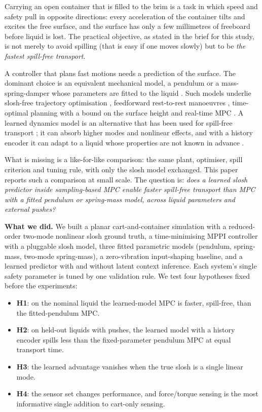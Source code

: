 Carrying an open container that is filled to the brim is a task in which speed and safety pull in opposite directions: every acceleration of the container tilts and excites the free surface, and the surface has only a few millimetres of freeboard before liquid is lost. The practical objective, as stated in the brief for this study, is not merely to avoid spilling (that is easy if one moves slowly) but to be \emph{the fastest spill-free transport}.

A controller that plans fast motions needs a prediction of the surface. The dominant choice is an equivalent mechanical model, a pendulum or a mass-spring-damper whose parameters are fitted to the liquid \cite{capolupo2025equivalent,guagliumi2021simple,leva2022sloshing}. Such models underlie slosh-free trajectory optimisation \cite{muchacho2022solution}, feedforward rest-to-rest manoeuvres \cite{toth2024rapid}, time-optimal planning with a bound on the surface height \cite{ferrari2026time} and real-time MPC \cite{medico2026model,hynninen2026emergency}. A learned dynamics model is an alternative that has been used for spill-free transport \cite{abderezaei2024clutter}; it can absorb higher modes and nonlinear effects, and with a history encoder it can adapt to a liquid whose properties are not known in advance \cite{kumar2021rma,evans2022context}.

What is missing is a like-for-like comparison: the same plant, optimiser, spill criterion and tuning rule, with only the slosh model exchanged. This paper reports such a comparison at small scale. The question is: \emph{does a learned slosh predictor inside sampling-based MPC enable faster spill-free transport than MPC with a fitted pendulum or spring-mass model, across liquid parameters and external pushes?}

\textbf{What we did.} We built a planar cart-and-container simulation with a reduced-order two-mode nonlinear slosh ground truth, a time-minimising MPPI controller with a pluggable slosh model, three fitted parametric models (pendulum, spring-mass, two-mode spring-mass), a zero-vibration input-shaping baseline, and a learned predictor with and without latent context inference. Each system's single safety parameter is tuned by one validation rule. We test four hypotheses fixed before the experiments:
\begin{itemize}
\item \textbf{H1}: on the nominal liquid the learned-model MPC is faster, spill-free, than the fitted-pendulum MPC.
\item \textbf{H2}: on held-out liquids with pushes, the learned model with a history encoder spills less than the fixed-parameter pendulum MPC at equal transport time.
\item \textbf{H3}: the learned advantage vanishes when the true slosh is a single linear mode.
\item \textbf{H4}: the sensor set changes performance, and force/torque sensing is the most informative single addition to cart-only sensing.
\end{itemize}

